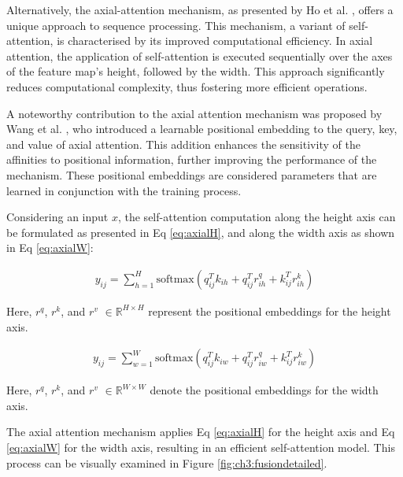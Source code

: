Alternatively, the axial-attention mechanism, as presented by Ho et al. \cite{ho2019axial}, offers a unique approach to sequence processing. This mechanism, a variant of self-attention, is characterised by its improved computational efficiency. In axial attention, the application of self-attention is executed sequentially over the axes of the feature map's height, followed by the width. This approach significantly reduces computational complexity, thus fostering more efficient operations.

A noteworthy contribution to the axial attention mechanism was proposed by Wang et al. \cite{wang2020axial}, who introduced a learnable positional embedding to the query, key, and value of axial attention. This addition enhances the sensitivity of the affinities to positional information, further improving the performance of the mechanism. These positional embeddings are considered parameters that are learned in conjunction with the training process.

Considering an input $x$, the self-attention computation along the height axis can be formulated as presented in Eq \ref{eq:axialH}, and along the width axis as shown in Eq \ref{eq:axialW}:

\begin{equation} \label{eq:axialH}
    \begin{split}
        y_{ij} = \sum_{h=1}^{H} \text{softmax}\left(q_{ij}^{T}k_{ih} + q_{ij}^{T} r_{ih}^q + k_{ij}^{T} r_{ih}^k\right)
    \end{split}
\end{equation}

Here, $r^q$, $r^k$, and $r^v$ $\in \mathbb{R}^{H \times H}$ represent the positional embeddings for the height axis. 

\begin{equation} \label{eq:axialW}
    \begin{split}
        y_{ij} = \sum_{w=1}^{W} \text{softmax}\left(q_{ij}^{T} k_{iw} + q_{ij}^{T} r_{iw}^q + k_{ij}^{T} r_{iw}^k\right)
    \end{split}
\end{equation}

Here, $r^q$, $r^k$, and $r^v$ $\in \mathbb{R}^{W \times W}$ denote the positional embeddings for the width axis.

The axial attention mechanism applies Eq \ref{eq:axialH} for the height axis and Eq \ref{eq:axialW} for the width axis, resulting in an efficient self-attention model. This process can be visually examined in Figure \ref{fig:ch3:fusiondetailed}. 

